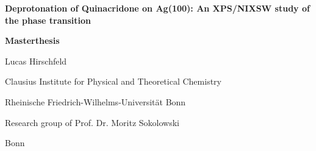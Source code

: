 \begin{titlepage}
	\centering
	{\scshape\LARGE \par}
	\vspace{1cm}
	{\huge\bfseries \textsf{Deprotonation of Quinacridone on Ag(100): An XPS/NIXSW study of the phase transition}\par}
	\vspace{3 cm}
	{\Large\bfseries Masterthesis \par}
	\vspace{3cm}
    {\large Lucas Hirschfeld\par}
	\vspace{3cm}
    {\large Clausius Institute for Physical and Theoretical Chemistry \par
	Rheinische Friedrich-Wilhelms-Universität Bonn\par}
	\vspace{2.5cm}
    {\large Research group of Prof. Dr. Moritz Sokolowski\par}
	\vfill
	{\large Bonn
	\the\year{}}
\end{titlepage}


\cleardoublepage

\thispagestyle{empty}
\tableofcontents
\cleardoublepage